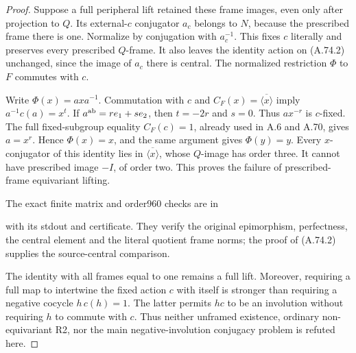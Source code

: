\begin{proof}
Suppose a full peripheral lift retained these frame images, even
only after projection to \(Q\). Its external-\(c\) conjugator
\(a_c\) belongs to \(N\), because the prescribed frame there
is one. Normalize by conjugation with \(a_c^{-1}\). This fixes
\(c\) literally and preserves every prescribed \(Q\)-frame.
It also leaves the identity action on (A.74.2) unchanged, since
the image of \(a_c\) there is central. The normalized restriction
\(\Phi\) to \(F\) commutes with \(c\).

Write \(\Phi(x)=a x a^{-1}\). Commutation with \(c\) and
\(C_F(x)=\overline{\langle x\rangle}\) imply
\(a^{-1}c(a)=x^t\). If
\(a^{\rm ab}=r e_1+s e_2\), then
\(t=-2r\) and \(s=0\). Thus \(a x^{-r}\) is \(c\)-fixed.
The full fixed-subgroup equality \(C_F(c)=1\), already used in
A.6 and A.70, gives \(a=x^r\). Hence \(\Phi(x)=x\), and the
same argument gives \(\Phi(y)=y\). Every \(x\)-conjugator of
this identity lies in \(\overline{\langle x\rangle}\), whose
\(Q\)-image has order three. It cannot have prescribed image
\(-I\), of order two. This proves the failure of prescribed-frame
equivariant lifting.

The exact finite matrix and order960 checks are in
\begin{quote}\small
{}
\end{quote}
with its stdout and certificate. They verify the original epimorphism,
perfectness, the central element and the literal quotient frame norms;
the proof of (A.74.2) supplies the source-central comparison.

The identity with all frames equal to one remains a full lift.
Moreover, requiring a full map to intertwine the fixed action \(c\)
with itself is stronger than requiring a negative cocycle
\(h\,c(h)=1\). The latter permits \(hc\) to be an involution
without requiring \(h\) to commute with \(c\). Thus neither
unframed existence, ordinary non-equivariant R2, nor the main
negative-involution conjugacy problem is refuted here.
\end{proof}
